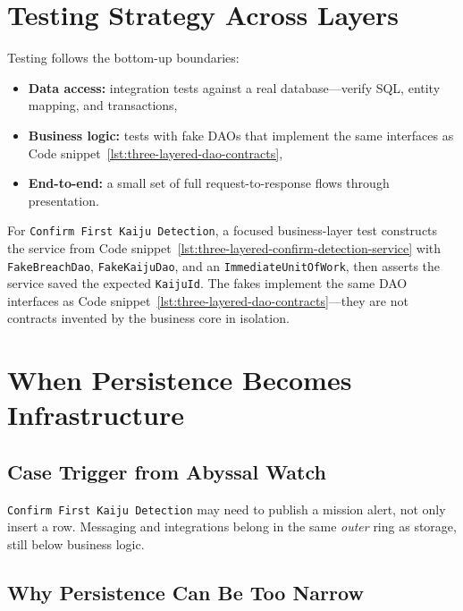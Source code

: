 \section{Testing Strategy Across Layers}
\label{sec:three_layered_testing}

Testing follows the bottom-up boundaries:
\begin{itemize}
    \item \textbf{Data access:} integration tests against a real database---verify SQL, entity mapping, and transactions,
    \item \textbf{Business logic:} tests with fake DAOs that implement the same interfaces as Code snippet~\ref{lst:three-layered-dao-contracts},
    \item \textbf{End-to-end:} a small set of full request-to-response flows through presentation.
\end{itemize}

For \texttt{Confirm First Kaiju Detection}, a focused business-layer test constructs the service from Code snippet~\ref{lst:three-layered-confirm-detection-service} with \texttt{FakeBreachDao}, \texttt{FakeKaijuDao}, and an \texttt{ImmediateUnitOfWork}, then asserts the service saved the expected \texttt{KaijuId}. The fakes implement the same DAO interfaces as Code snippet~\ref{lst:three-layered-dao-contracts}---they are not contracts invented by the business core in isolation.

\section{When Persistence Becomes Infrastructure}
\label{sec:three_layered_persistence_to_infrastructure}

\subsection{Case Trigger from Abyssal Watch}
\label{sec:three_layered_persistence_to_infrastructure_case_trigger}

\texttt{Confirm First Kaiju Detection} may need to publish a mission alert, not only insert a row. Messaging and integrations belong in the same \textit{outer} ring as storage, still below business logic.

\subsection{Why Persistence Can Be Too Narrow}
\label{sec:three_layered_persistence_to_infrastructure_why}


